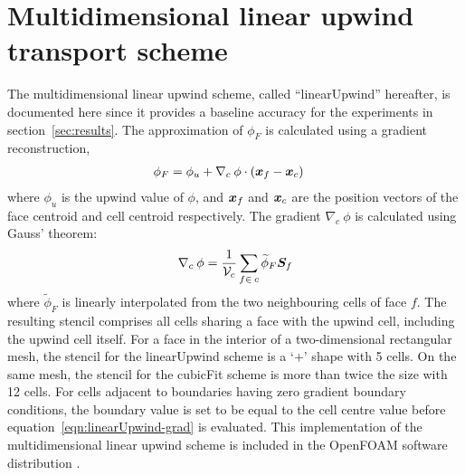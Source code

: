 \section{Multidimensional linear upwind transport scheme}

The multidimensional linear upwind scheme, called ``linearUpwind'' hereafter, is documented here since it provides a baseline accuracy for the experiments in section~\ref{sec:results}.  The approximation of $\phi_F$ is calculated using a gradient reconstruction,
\begin{align}
	\phi_F &= \phi_u + \nabla_c\: \phi \cdot \left(\bm{x}_f - \bm{x}_c \right)
\end{align} 
where $\phi_u$ is the upwind value of $\phi$, and $\bm{x}_f$ and $\bm{x}_c$ are the position vectors of the face centroid and cell centroid respectively.
The gradient $\nabla_c \:\phi$ is calculated using Gauss' theorem:
\begin{align}
	\nabla_c\: \phi = \frac{1}{\mathcal{V}_c} \sum_{f\in\:c} \widetilde{\phi}_F \bm{S}_f \label{eqn:linearUpwind-grad}
\end{align}
where $\widetilde{\phi}_F$ is linearly interpolated from the two neighbouring cells of face $f$.
The resulting stencil comprises all cells sharing a face with the upwind cell, including the upwind cell itself.  For a face in the interior of a two-dimensional rectangular mesh, the stencil for the linearUpwind scheme is a `$+$' shape with 5 cells.  On the same mesh, the stencil for the cubicFit scheme is more than twice the size with 12 cells.
For cells adjacent to boundaries having zero gradient boundary conditions, the boundary value is set to be equal to the cell centre value before equation~\eqref{eqn:linearUpwind-grad} is evaluated.
This implementation of the multidimensional linear upwind scheme is included in the OpenFOAM software distribution \citep{openfoam-numerics}.
